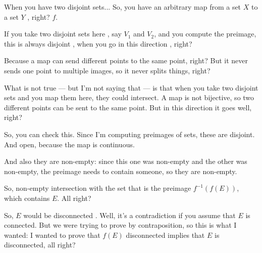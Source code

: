\begin{proofWrapper}
\begin{hidden}
\end{hidden}

\begin{speech}[00:26:01 - 00:28:02]
When you have two disjoint sets... So, you have an arbitrary map from a set $X$ to a set $Y$ , right? $f$.

If you take two disjoint sets here , say $V_1$ and $V_2$, and you compute the preimage, this is always disjoint , when you go in this direction , right?

Because a map can send different points to the same point, right? But it never sends one point to multiple images, so it never splits things, right?

What is not true --- but I'm not saying that --- is that when you take two disjoint sets and you map them here, they could intersect. A map is not bijective, so two different points can be sent to the same point. But in this direction it goes well, right?

So, you can check this. Since I'm computing preimages of sets, these are disjoint. And open, because the map is continuous.

And also they are non-empty: since this one was non-empty and the other was non-empty, the preimage needs to contain someone, so they are non-empty.

So, non-empty intersection  with the set that is the preimage $f^{-1}(f(E))$, which contains $E$. All right?

So, $E$ would be disconnected . Well, it's a contradiction if you assume that $E$ is connected. But we were trying to prove by contraposition, so this is what I wanted: I wanted to prove that $f(E)$ disconnected implies that $E$ is disconnected, all right? 
\end{speech}


\end{proofWrapper}
